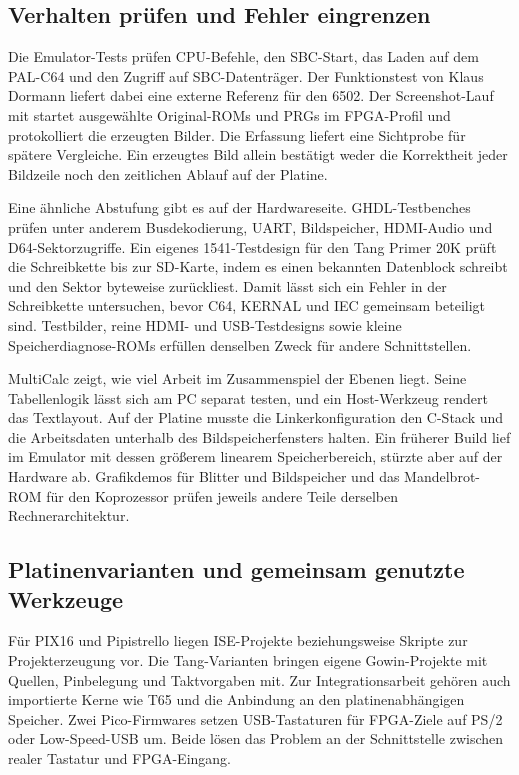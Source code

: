 \documentclass[fontsize=10.2bp,DIV=calc,oneside,open=any,headings=normal,numbers=noenddot]{scrbook}
\begin{document}
\clearpage
\subsection{Verhalten prüfen und Fehler eingrenzen}

Die Emulator-Tests prüfen CPU-Befehle, den SBC-Start, das Laden auf dem
PAL-C64 und den Zugriff auf SBC-Datenträger. Der Funktionstest von
Klaus Dormann liefert dabei eine externe Referenz für den 6502. Der
Screenshot-Lauf mit  startet
ausgewählte Original-ROMs und PRGs im FPGA-Profil und protokolliert
die erzeugten Bilder. Die Erfassung liefert eine Sichtprobe für spätere
Vergleiche. Ein erzeugtes Bild
allein bestätigt weder die Korrektheit jeder Bildzeile noch den
zeitlichen Ablauf auf der Platine.

Eine ähnliche Abstufung gibt es auf der Hardwareseite. GHDL-Testbenches
prüfen unter anderem Busdekodierung, UART, Bildspeicher, HDMI-Audio
und D64-Sektorzugriffe. Ein eigenes 1541-Testdesign für den Tang
Primer 20K prüft die Schreibkette bis zur SD-Karte, indem es einen
bekannten Datenblock schreibt und den Sektor byteweise zurückliest.
Damit lässt sich ein Fehler in der Schreibkette untersuchen, bevor
C64, KERNAL und IEC gemeinsam beteiligt sind. Testbilder, reine
HDMI- und USB-Testdesigns sowie kleine Speicherdiagnose-ROMs erfüllen
denselben Zweck für andere Schnittstellen.

MultiCalc zeigt, wie viel Arbeit im Zusammenspiel der Ebenen liegt.
Seine Tabellenlogik lässt sich am PC separat testen, und ein
Host-Werkzeug rendert das Textlayout. Auf der Platine musste die
Linkerkonfiguration den C-Stack und die Arbeitsdaten unterhalb des
Bildspeicherfensters halten. Ein früherer Build lief im Emulator mit
dessen größerem linearem Speicherbereich, stürzte aber auf der
Hardware ab. Grafikdemos für Blitter und Bildspeicher und das
Mandelbrot-ROM für den Koprozessor prüfen jeweils andere Teile
derselben Rechnerarchitektur.

\subsection{Platinenvarianten und gemeinsam genutzte Werkzeuge}

Für PIX16 und Pipistrello liegen ISE-Projekte beziehungsweise Skripte
zur Projekterzeugung vor. Die Tang-Varianten bringen eigene
Gowin-Projekte mit Quellen, Pinbelegung und Taktvorgaben mit. Zur
Integrationsarbeit gehören auch importierte Kerne wie T65 und die
Anbindung an den platinenabhängigen Speicher. Zwei Pico-Firmwares
setzen USB-Tastaturen für FPGA-Ziele auf PS/2 oder Low-Speed-USB um.
Beide lösen das Problem an der Schnittstelle zwischen realer Tastatur
und FPGA-Eingang.
\end{document}
